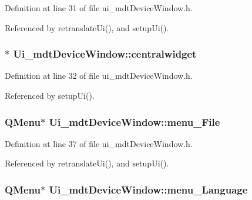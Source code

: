 Definition at line 31 of file ui\-\_\-mdt\-Device\-Window.\-h.



Referenced by retranslate\-Ui(), and setup\-Ui().

\hypertarget{class_ui__mdt_device_window_ad43c2b08a1dad506369adf975eab9fcd}{
\subsubsection[{centralwidget}]{$\ast$ Ui\-\_\-mdt\-Device\-Window\-::centralwidget}}\label{class_ui__mdt_device_window_ad43c2b08a1dad506369adf975eab9fcd}


Definition at line 32 of file ui\-\_\-mdt\-Device\-Window.\-h.



Referenced by setup\-Ui().

\hypertarget{class_ui__mdt_device_window_a088b11fa8e9aa435204bac4d9ffc466e}{
\subsubsection[{menu\-\_\-\-File}]{\setlength{\rightskip}{0pt plus 5cm}Q\-Menu$\ast$ Ui\-\_\-mdt\-Device\-Window\-::menu\-\_\-\-File}}\label{class_ui__mdt_device_window_a088b11fa8e9aa435204bac4d9ffc466e}


Definition at line 37 of file ui\-\_\-mdt\-Device\-Window.\-h.



Referenced by retranslate\-Ui(), and setup\-Ui().

\hypertarget{class_ui__mdt_device_window_a45c608b27713d71d937f7c21c5f90e9f}{
\subsubsection[{menu\-\_\-\-Language}]{\setlength{\rightskip}{0pt plus 5cm}Q\-Menu$\ast$ Ui\-\_\-mdt\-Device\-Window\-::menu\-\_\-\-Language}}\label{class_ui__mdt_device_window_a45c608b27713d71d937f7c21c5f90e9f}


